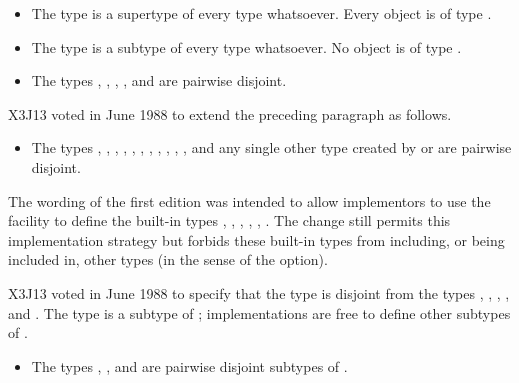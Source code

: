 {\begin{itemize}
\item
The type  is a supertype of every type whatsoever.
Every object is of type .

\item
The type {\nil} is a subtype of every type whatsoever.
No object is of type {\nil}.
\end{itemize}

\begin{obsolete}
\begin{itemize}
\item
The types , , , , and 
are pairwise disjoint.
\end{itemize}
\end{obsolete}

\begin{new}
X3J13 voted in June 1988
to extend the preceding paragraph as follows.

\begin{itemize}
\item
The types , , , , ,
, , , ,
, , and any single other type created by
 or 
are pairwise disjoint.
\end{itemize}

The wording of the first edition was intended to allow implementors to use
the  facility to define the built-in types ,
, , , , .
The change still permits this implementation strategy but
forbids these built-in types from including, or being included in,
other types (in the sense of the   option).
\end{new}

\begin{new}
X3J13 voted in June 1988 
to specify that the type 
is disjoint from the types , , , , and .
The type  is a subtype of ;
implementations are free to define other subtypes of .
\end{new}

\begin{obsolete}
\begin{itemize}
\item
The types , , and  are pairwise disjoint
subtypes of .
\end{itemize}
\end{obsolete}

}
